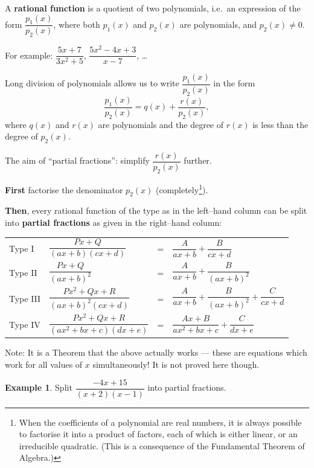 \documentclass[
  12pt,
  oneside]{book}
\theoremstyle{definition}
\theoremstyle{definition}
\newtheorem{example}{Example}[chapter]
\theoremstyle{definition}
\theoremstyle{definition}
\theoremstyle{remark}
\begin{document}
A \textbf{rational function} is a quotient of two polynomials, i.e.~an expression of the form \(\dfrac{p_1(x)}{p_2(x)}\), where both \(p_1(x)\) and \(p_2(x)\) are polynomials, and \(p_2(x)\neq0\).

For example: \(\dfrac{5x+7}{3x^2+5}\), \(\dfrac{5x^2-4x+3}{x-7}\), \ldots{}

Long division of polynomials allows us to write \(\dfrac{p_1(x)}{p_2(x)}\) in the form
\[
\frac{p_1(x)}{p_2(x)} = q(x) + \frac{r(x)}{p_2(x)},
\]
where \(q(x)\) and \(r(x)\) are polynomials and the degree of \(r(x)\) is less than
the degree of \(p_2(x)\).

The aim of ``partial fractions'': simplify \(\dfrac{r(x)}{p_2(x)}\) further.

\textbf{First} factorise the denominator \(p_2(x)\) (completely\footnote{When the coefficients of a polynomial are real numbers, it is always possible to factorise it into a product of factors, each of which is either linear, or an irreducible quadratic. (This is a consequence of the Fundamental Theorem of Algebra.)}).

\textbf{Then}, every rational function of the type as in the left--hand column can be split
into \textbf{partial fractions} as given in the right--hand column:

\begin{longtable}[]{@{}
  >{\raggedright\arraybackslash}p{}
  >{\raggedleft\arraybackslash}p{}
  >{\raggedright\arraybackslash}p{}
  >{\raggedright\arraybackslash}p{}@{}}
\toprule()
\endhead
Type I & \(\dfrac{Px+Q}{(ax+b)(cx+d)}\) & = & \(\dfrac{A}{ax+b}+\dfrac{B}{cx+d}\) \\
Type II & \(\dfrac{Px+Q}{(ax+b)^2}\) & = & \(\dfrac{A}{ax+b}+\dfrac{B}{(ax+b)^2}\) \\
Type III & \(\dfrac{Px^2+Qx+R}{(ax+b)^2(cx+d)}\) & = & \(\dfrac{A}{ax+b}+\dfrac{B}{(ax+b)^2}+\dfrac{C}{cx+d}\) \\
Type IV & \(\dfrac{Px^2+Qx+R}{(ax^2+bx+c)(dx+e)}\) & = & \(\dfrac{Ax+B}{ax^2+bx+c}+\dfrac{C}{dx+e}\) \\
\bottomrule()
\end{longtable}

Note: It is a Theorem that the above actually works --- these are equations which work for all values of \(x\) simultaneously! It is not proved here though.

\begin{example}
Split \(\dfrac{-4x+15}{(x+2)(x-1)}\) into partial fractions.
\end{example}
\end{document}
